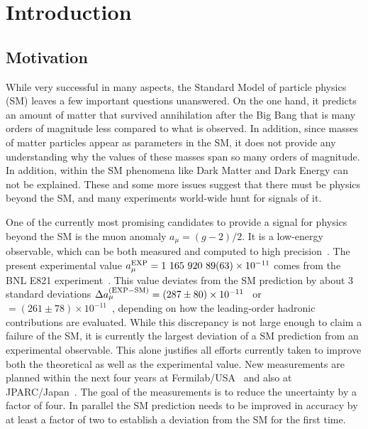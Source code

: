 \section{Introduction}
\subsection{Motivation}
While very successful in many aspects, the Standard Model of particle physics (SM)
leaves a few important questions unanswered. On the one hand, it predicts
an amount of matter that survived annihilation after the Big Bang that is many orders
of magnitude less compared to what is observed. In addition, since masses
of matter particles appear as parameters in the SM, it does not provide any understanding
why the values of these masses span so many orders of magnitude.
In addition, within the SM phenomena like Dark Matter and Dark Energy can not be explained.
These and some more 
issues suggest that there must be physics beyond the SM, and many experiments
world-wide hunt for signals of it. 

One of the currently most promising candidates to provide a signal for physics beyond the SM
is the muon anomaly $a_\mu = (g-2)/2$. It is a low-energy observable, which
can be both measured and computed to high precision~\cite{Jegerlehner:2009ry,Blum:2013xva}.  The present experimental
value $a_\mu^{\rm EXP}= 1\ 165\ 920\ 89 (63)\times 10^{-11}$
comes from the BNL E821 experiment~\cite{Bennett:2006fi}.  This value
deviates from the SM prediction by about 3 standard
deviations $\Delta a_\mu^{({\rm EXP-SM})}= (287\pm 80)\times 10^{-11}$~\cite{Davier:2010nc} 
or $= (261\pm 78)\times 10^{-11}$~\cite{Hagiwara:2011af}, depending on how the leading-order
hadronic contributions are evaluated.  While this discrepancy
is not large enough to claim a failure of the SM, it is currently the largest
deviation of a SM prediction from an experimental observable. This
alone justifies all efforts currently taken to improve both the theoretical as well as the experimental value.
New measurements are planned within the next four years at 
Fermilab/USA~\cite{Grange:2015fou} and also at JPARC/Japan~\cite{Saito:2012zz}. The goal
of the measurements is to reduce the uncertainty by a factor of four. 
In parallel the SM prediction needs to be improved in accuracy 
by at least a factor of two to establish a deviation from the SM for the first time.


